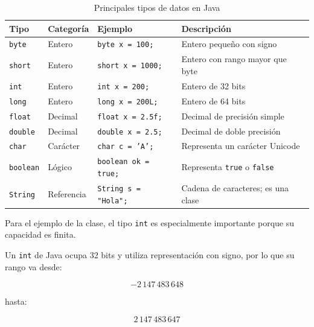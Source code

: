\documentclass[12pt,a4paper]{article}
\begin{document}
\begin{table}[H]
\centering
\caption{Principales tipos de datos en Java}
\renewcommand{\arraystretch}{1.3}

\begin{tabular}{p{2cm} p{2.5cm} p{3.5cm} p{5cm}}
\toprule
\textbf{Tipo} &
\textbf{Categoría} &
\textbf{Ejemplo} &
\textbf{Descripción} \\
\midrule

\texttt{byte} &
Entero &
\texttt{byte x = 100;} &
Entero pequeño con signo \\

\texttt{short} &
Entero &
\texttt{short x = 1000;} &
Entero con rango mayor que byte \\

\texttt{int} &
Entero &
\texttt{int x = 200;} &
Entero de 32 bits \\

\texttt{long} &
Entero &
\texttt{long x = 200L;} &
Entero de 64 bits \\

\texttt{float} &
Decimal &
\texttt{float x = 2.5f;} &
Decimal de precisión simple \\

\texttt{double} &
Decimal &
\texttt{double x = 2.5;} &
Decimal de doble precisión \\

\texttt{char} &
Carácter &
\texttt{char c = 'A';} &
Representa un carácter Unicode \\

\texttt{boolean} &
Lógico &
\texttt{boolean ok = true;} &
Representa \texttt{true} o \texttt{false} \\

\texttt{String} &
Referencia &
\texttt{String s = "Hola";} &
Cadena de caracteres; es una clase \\

\bottomrule
\end{tabular}

\end{table}

Para el ejemplo de la clase, el tipo \texttt{int} es especialmente
importante porque su capacidad es finita.

Un \texttt{int} de Java ocupa 32 bits y utiliza representación con
signo, por lo que su rango va desde:

\[
-2\,147\,483\,648
\]

hasta:

\[
2\,147\,483\,647
\]
\end{document}
